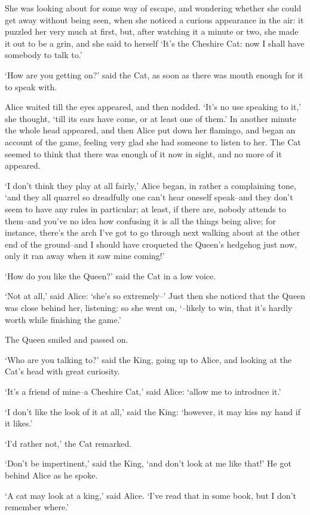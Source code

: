 \documentclass[statementpaper,twoside,openany]{memoir}
\begin{document}
She was looking about for some way of escape, and wondering whether she could get away without being seen, when she noticed a curious appearance in the air: it puzzled her very much at first, but, after watching it a minute or two, she made it out to be a grin, and she said to herself `It's the Cheshire Cat: now I shall have somebody to talk to.'

`How are you getting on?' said the Cat, as soon as there was mouth enough for it to speak with.

Alice waited till the eyes appeared, and then nodded. `It's no use speaking to it,' she thought, `till its ears have come, or at least one of them.' In another minute the whole head appeared, and then Alice put down her flamingo, and began an account of the game, feeling very glad she had someone to listen to her. The Cat seemed to think that there was enough of it now in sight, and no more of it appeared.

`I don't think they play at all fairly,' Alice began, in rather a complaining tone, `and they all quarrel so dreadfully one can't hear oneself speak--and they don't seem to have any rules in particular; at least, if there are, nobody attends to them--and you've no idea how confusing it is all the things being alive; for instance, there's the arch I've got to go through next walking about at the other end of the ground--and I should have croqueted the Queen's hedgehog just now, only it ran away when it saw mine coming!'

`How do you like the Queen?' said the Cat in a low voice.

`Not at all,' said Alice: `she's so extremely--' Just then she noticed that the Queen was close behind her, listening: so she went on, `--likely to win, that it's hardly worth while finishing the game.'

The Queen smiled and passed on.

`Who are you talking to?' said the King, going up to Alice, and looking at the Cat's head with great curiosity.

`It's a friend of mine--a Cheshire Cat,' said Alice: `allow me to introduce it.'

`I don't like the look of it at all,' said the King: `however, it may kiss my hand if it likes.'

`I'd rather not,' the Cat remarked.

`Don't be impertinent,' said the King, `and don't look at me like that!' He got behind Alice as he spoke.

`A cat may look at a king,' said Alice. `I've read that in some book, but I don't remember where.'
\end{document}
